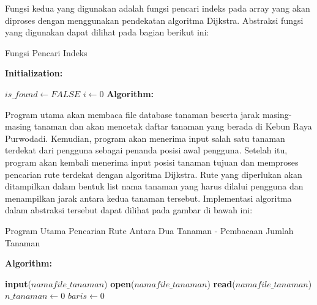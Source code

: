 \documentclass[conference]{IEEEtran}
\begin{document}
Fungsi kedua yang digunakan adalah fungsi pencari indeks pada array yang akan diproses dengan menggunakan pendekatan algoritma Dijkstra. Abstraksi fungsi yang digunakan dapat dilihat pada bagian berikut ini:
\begin{algorithm}
\caption{Fungsi Pencari Indeks }\label{alg:three}
\textbf{Initialization:}

$is\_found \gets FALSE$\;
$i \gets 0$\;
\textbf{Algorithm:}

\end{algorithm}

	Program utama akan membaca file database tanaman beserta jarak masing-masing tanaman dan akan mencetak daftar tanaman yang berada di Kebun Raya Purwodadi. Kemudian, program akan menerima input salah satu tanaman terdekat dari pengguna sebagai penanda posisi awal pengguna. Setelah itu, program akan kembali menerima input posisi tanaman tujuan dan memproses pencarian rute terdekat dengan algoritma Dijkstra. Rute yang diperlukan akan ditampilkan dalam bentuk list nama tanaman yang harus dilalui pengguna dan menampilkan jarak antara kedua tanaman tersebut. Implementasi algoritma dalam abstraksi tersebut dapat dilihat pada gambar di bawah ini:
\begin{algorithm}
\caption{Program Utama Pencarian Rute Antara Dua Tanaman - Pembacaan Jumlah Tanaman}\label{alg:four}
\textbf{Algorithm:}

\textbf{input}($namafile\_tanaman$)\;
\textbf{open}($namafile\_tanaman$)\;
\textbf{read}($namafile\_tanaman$)\;
$n\_tanaman \gets 0$\;
$baris \gets 0$\;
\end{algorithm}
	
\end{document}
